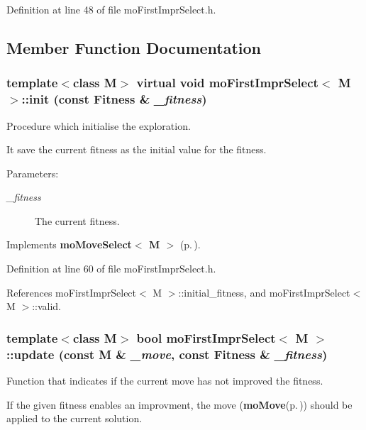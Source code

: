 Definition at line 48 of file mo\-First\-Impr\-Select.h.

\subsection{Member Function Documentation}
\subsubsection{\setlength{\rightskip}{0pt plus 5cm}template$<$class M$>$ virtual void {\bf mo\-First\-Impr\-Select}$<$ M $>$::init (const {\bf Fitness} \& {\em \_\-fitness})\hspace{0.3cm}{\tt  [inline, virtual]}}\label{classmo_first_impr_select_a0}


Procedure which initialise the exploration. 

It save the current fitness as the initial value for the fitness. \begin{Desc}
\item[Parameters:]
\begin{description}
\item[{\em \_\-fitness}]The current fitness. \end{description}
\end{Desc}


Implements {\bf mo\-Move\-Select$<$ M $>$} {\rm (p.\,\pageref{classmo_move_select_a0})}.

Definition at line 60 of file mo\-First\-Impr\-Select.h.

References mo\-First\-Impr\-Select$<$ M $>$::initial\_\-fitness, and mo\-First\-Impr\-Select$<$ M $>$::valid.
\subsubsection{\setlength{\rightskip}{0pt plus 5cm}template$<$class M$>$ bool {\bf mo\-First\-Impr\-Select}$<$ M $>$::update (const M \& {\em \_\-move}, const {\bf Fitness} \& {\em \_\-fitness})\hspace{0.3cm}{\tt  [inline, virtual]}}\label{classmo_first_impr_select_a1}


Function that indicates if the current move has not improved the fitness. 

If the given fitness enables an improvment, the move ({\bf mo\-Move}{\rm (p.\,\pageref{classmo_move})}) should be applied to the current solution.

